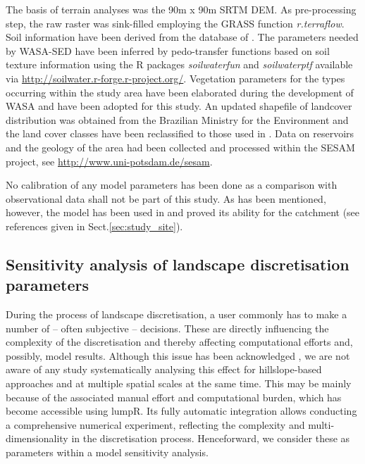 The basis of terrain analyses was the 90\unit{m} x 90\unit{m} SRTM DEM.
As pre-processing step, the raw raster was sink-filled employing the GRASS function \emph{r.terraflow}.
Soil information have been derived from the database of \citet{Jacomine1973}.
The parameters needed by WASA-SED have been inferred by pedo-transfer functions based on soil texture information using the R packages \emph{soilwaterfun} and \emph{soilwaterptf} available via \url{http://soilwater.r-forge.r-project.org/}.
Vegetation parameters for the types occurring within the study area have been elaborated during the development of WASA \citep{Guentner2002} and have been adopted for this study.
An updated shapefile of landcover distribution was obtained from the Brazilian Ministry for the Environment and the land cover classes have been reclassified to those used in \citep{Guentner2002}.
Data on reservoirs and the geology of the area had been collected and processed within the SESAM project, see \url{http://www.uni-potsdam.de/sesam}.

No calibration of any model parameters has been done as a comparison with observational data shall not be part of this study. 
As has been mentioned, however, the model has been used in and proved its ability for the catchment (see references given in Sect.\DIFaddbegin \DIFadd{\ }\DIFaddend \ref{sec:study_site}).


\subsection{Sensitivity analysis of landscape discretisation parameters}
\DIFaddbegin \label{sec:sensitivity_analysis}
\DIFaddend During the process of landscape discretisation, a user commonly has to make a number of -- often subjective -- decisions.
These are directly influencing the complexity of the discretisation and thereby affecting computational efforts and, possibly, model results.
Although this issue has been acknowledged \citep[e.g.,][]{Ajami2016,Fenicia2016}, we are not aware of any study systematically analysing this effect for hillslope-based approaches and at multiple spatial scales at the same time.
This may be mainly because of the associated manual effort and computational burden, which has become accessible using lumpR.
Its fully automatic integration allows conducting a comprehensive numerical experiment, reflecting the complexity and multi-dimensionality in the discretisation process.
Henceforward, we consider these as parameters within a model sensitivity analysis.

